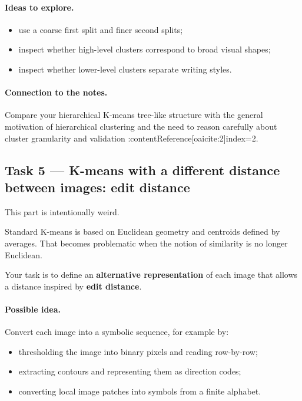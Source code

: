 \documentclass[11pt]{article}
\begin{document}
\paragraph{Ideas to explore.}
\begin{itemize}[itemsep=2pt]
    \item use a coarse first split and finer second splits;
    \item inspect whether high-level clusters correspond to broad visual shapes;
    \item inspect whether lower-level clusters separate writing styles.
\end{itemize}

\paragraph{Connection to the notes.}
Compare your hierarchical K-means tree-like structure with the general motivation of hierarchical clustering and the need to reason carefully about cluster granularity and validation :contentReference[oaicite:2]{index=2}.

\subsection*{Task 5 --- K-means with a different distance between images: edit distance}

This part is intentionally weird.

Standard K-means is based on Euclidean geometry and centroids defined by averages. That becomes problematic when the notion of similarity is no longer Euclidean.

Your task is to define an \textbf{alternative representation} of each image that allows a distance inspired by \textbf{edit distance}.

\paragraph{Possible idea.}
Convert each image into a symbolic sequence, for example by:
\begin{itemize}[itemsep=2pt]
    \item thresholding the image into binary pixels and reading row-by-row;
    \item extracting contours and representing them as direction codes;
    \item converting local image patches into symbols from a finite alphabet.
\end{itemize}
\end{document}
